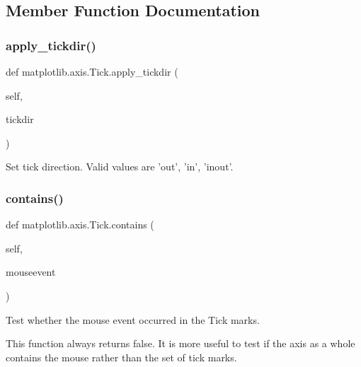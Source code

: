 \subsection{Member Function Documentation}
\mbox{\label{classmatplotlib_1_1axis_1_1Tick_aafa4b88843ee225f3cc35373985ee4de}} 
\subsubsection{\texorpdfstring{apply\+\_\+tickdir()}{apply\_tickdir()}}
{\footnotesize\ttfamily def matplotlib.\+axis.\+Tick.\+apply\+\_\+tickdir (\begin{DoxyParamCaption}\item[{}]{self,  }\item[{}]{tickdir }\end{DoxyParamCaption})}

\begin{DoxyVerb}Set tick direction.  Valid values are 'out', 'in', 'inout'.\end{DoxyVerb}
 \mbox{\label{classmatplotlib_1_1axis_1_1Tick_a978fb698633ac0dba6f47ed88470adfb}} 
\subsubsection{\texorpdfstring{contains()}{contains()}}
{\footnotesize\ttfamily def matplotlib.\+axis.\+Tick.\+contains (\begin{DoxyParamCaption}\item[{}]{self,  }\item[{}]{mouseevent }\end{DoxyParamCaption})}

\begin{DoxyVerb}Test whether the mouse event occurred in the Tick marks.

This function always returns false.  It is more useful to test if the
axis as a whole contains the mouse rather than the set of tick marks.
\end{DoxyVerb}
 \mbox{\label{classmatplotlib_1_1axis_1_1Tick_abfb1e735552da4151af7a860a5f1771e}} 
